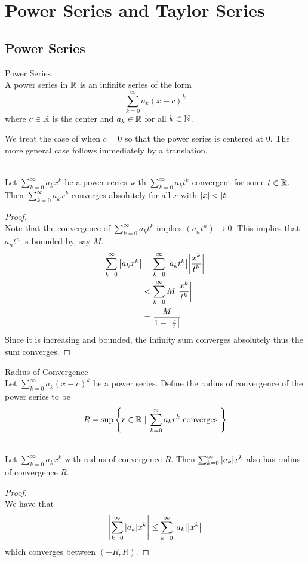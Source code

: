 \documentclass[a4paper]{article}
\begin{document}
\pagebreak
\section{Power Series and Taylor Series}
\subsection{Power Series}
\begin{defn}{Power Series}{}\\ A power series in $\mathbb{R}$ is an infinite series of the form $$\sum_{k=0}^\infty a_k(x-c)^k$$ where $c\in\mathbb{R}$ is the center and $a_k\in\mathbb{R}$ for all $k\in\mathbb{N}$. 
\end{defn}

We treat the case of when $c=0$ so that the power series is centered at $0$. The more general case follows immediately by a translation. 

\begin{thm}{}{}\\ Let $\sum_{k=0}^{\infty}a_kx^k$ be a power series with $\sum_{k=0}^{\infty}a_kt^k$ convergent for some $t\in\mathbb{R}$. Then $\sum_{k=0}^{\infty}a_kx^k$ converges absolutely for all $x$ with $\abs{x}<\abs{t}$. 
\begin{proof}\\ Note that the convergence of $\sum_{k=0}^{\infty}a_kt^k$ implies $(a_nt^n)\to 0$. This implies that $a_nt^n$ is bounded by, say $M$. 
\begin{align*}
\sum_{k=0}^{\infty}\abs{a_kx^k}&=\sum_{k=0}^{\infty}\abs{a_kt^k}\abs{\frac{x^k}{t^k}}\\
&<\sum_{k=0}^{\infty}M\abs{\frac{x^k}{t^k}}\\
&=\frac{M}{1-\abs{\frac{x}{t}}}\\
\end{align*} Since it is increasing and bounded, the infinity sum converges absolutely thus the sum converges. 
\end{proof}
\end{thm}

\begin{defn}{Radius of Convergence}{}\\ Let $\sum_{k=0}^\infty a_k(x-c)^k$ be a power series. Define the radius of convergence of the power series to be $$R=\sup\left\{r\in\mathbb{R}\;|\;\sum_{k=0}^\infty a_kr^k\text{ converges }\right\}$$
\end{defn}

\begin{prp}{}{}\\ Let $\sum_{k=0}^{\infty}a_kx^k$ with radius of convergence $R$. Then $\sum_{k=0}^{\infty}\abs{a_k}x^k$ also has radius of convergence $R$. 
\begin{proof}\\ We have that $$\abs{\sum_{k=0}^{\infty}\abs{a_k}x^k}\leq\sum_{k=0}^{\infty}\abs{a_k}\abs{x^k}$$ which converges between $(-R,R)$. 
\end{proof}
\end{prp}
\end{document}

